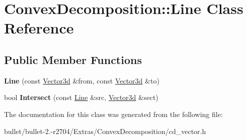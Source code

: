 \hypertarget{class_convex_decomposition_1_1_line}{\section{Convex\+Decomposition\+:\+:Line Class Reference}
\label{class_convex_decomposition_1_1_line}
}
\subsection*{Public Member Functions}
\begin{DoxyCompactItemize}
\item 
\hypertarget{class_convex_decomposition_1_1_line_af54452e3b5b8344d6b614fd53e270f07}{{\bfseries Line} (const \hyperlink{class_convex_decomposition_1_1_vector3d}{Vector3d} \&from, const \hyperlink{class_convex_decomposition_1_1_vector3d}{Vector3d} \&to)}\label{class_convex_decomposition_1_1_line_af54452e3b5b8344d6b614fd53e270f07}

\item 
\hypertarget{class_convex_decomposition_1_1_line_a3da99eccbbbf64d7eb0e0baf6159dfe1}{bool {\bfseries Intersect} (const \hyperlink{class_convex_decomposition_1_1_line}{Line} \&src, \hyperlink{class_convex_decomposition_1_1_vector3d}{Vector3d} \&sect)}\label{class_convex_decomposition_1_1_line_a3da99eccbbbf64d7eb0e0baf6159dfe1}

\end{DoxyCompactItemize}


The documentation for this class was generated from the following file\+:\begin{DoxyCompactItemize}
\item 
bullet/bullet-\/2.-\/r2704/\+Extras/\+Convex\+Decomposition/cd\+\_\+vector.\+h\end{DoxyCompactItemize}
